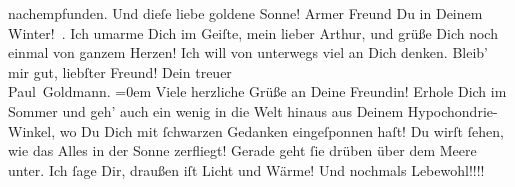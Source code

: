 \begin{ledgroupsized}[t]{13cm}
               nachempfunden.\pend
           \pstart
           Und dieſe liebe goldene Sonne! Armer Freund Du in Deinem Winter! .\textcolor{gray}{{\dotstwo}}\pend
           \pstart
           Ich umarme Dich im Geiſte, mein lieber Arthur, und grüße Dich noch einmal von ganzem
                  {\pb}Herzen! Ich will von unterwegs viel an Dich
               denken. Bleib’ mir gut, liebſter Freund!\pend
           \pstart
           Dein treuer {\\[\baselineskip]}\spacefill\mbox{Paul Goldmann.}\pend
           \leftskip=0em{}\pstart
           \noindent{}Viele herzliche Grüße an Deine Freundin!\pend
           \pstart
           Erhole Dich im Sommer und geh’ auch ein wenig in die Welt hinaus aus Deinem
                  Hypochondrie-Winkel, wo Du Dich mit ſchwarzen Gedanken eingeſponnen haſt! Du wirſt
                  ſehen, wie das Alles in der Sonne zerfliegt! Gerade geht ſie drüben über dem Meere
                  unter. Ich ſage Dir, draußen iſt Licht und Wärme!\pend
           \pstart
           Und nochmals Lebewohl!!!!\pend
           
         
         \endnumbering{}\end{ledgroupsized}  \newcommand{\dateiname}{L02847}\newcommand{\titel}{Paul Goldmann an Arthur Schnitzler, 4. 4. 1898}\newcommand{\editorInnen}{Martin Anton Müller und Laura Untner}
      